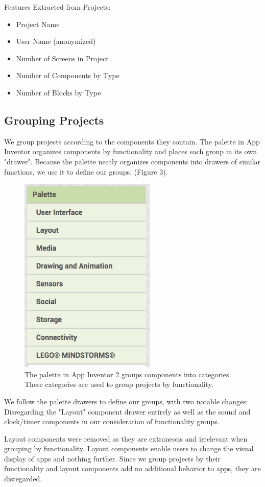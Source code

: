 \documentclass[conference]{IEEEtran}
\begin{document}
Features Extracted from Projects:
\begin{itemize}
	\item Project Name
	\item User Name (anonymized)
	\item Number of Screens in Project
	\item Number of Components by Type
	\item Number of Blocks by Type
\end{itemize}

\subsection{Grouping Projects}
We group projects according to the components they contain. The palette in App Inventor organizes components by functionality and places each group in its own "drawer". Because the palette neatly organizes components into drawers of similar functions, we use it to define our groups. (Figure 3). 

\begin{figure}[h!]
	\centering
	\includegraphics[width=0.4\linewidth]{palette.png}
	\caption{The palette in App Inventor 2 groups components into categories. These categories are used to group projects by functionality.}
	\label{FIgure 3: AI Designer Palette}
\end{figure}

We follow the palette drawers to define our groups, with two notable changes: Disregarding the "Layout" component drawer entirely as well as the sound and clock/timer components in our consideration of functionality groups. 

Layout components were removed as they are extraneous and irrelevant when grouping by functionality. Layout components enable users to change the visual display of apps and nothing further. Since we group projects by their functionality and layout components add no additional behavior to apps, they are disregarded.
\end{document}

